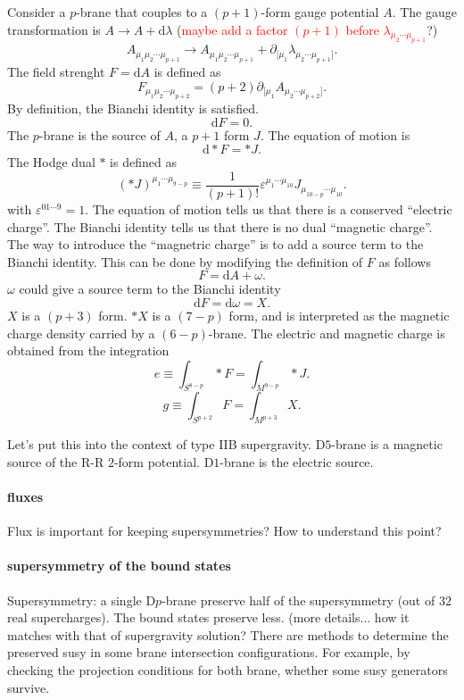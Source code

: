 Consider a $p$-brane that couples to a $(p+1)$-form gauge potential $A$.
The gauge transformation is $A \to A + \mathrm{d} \lambda$
(\textcolor{red}{maybe add a factor $(p+1)$ before $\lambda_{\mu_2\cdots\mu_{p+1}}$}?)
\[
	A_{\mu_1 \mu_2 \cdots \mu_{p+1}} \to A_{\mu_1 \mu_2 \cdots \mu_{p+1}}
	+ \partial_{[\mu_1} \lambda_{\mu_2 \cdots \mu_{p+1}]}
.\] 
The field strenght $F = \mathrm{d} A$ is defined as
\[
	F_{\mu_1 \mu_2 \cdots \mu_{p+2}} = (p+2) \partial_{[\mu_1}
	A_{\mu_2 \cdots \mu_{p+2}]}
.\] 
By definition, the Bianchi identity is satisfied.
\[
\mathrm{d} F = 0
.\] 
The $p$-brane is the source of $A$, a $p+1$ form $J$.
The equation of motion is
\[
\mathrm{d} * F = * J
.\] 
The Hodge dual $*$ is defined as
\[
	(* J)^{\mu_1 \cdots \mu_{9-p}}
	\equiv \frac{1}{(p+1)!} \varepsilon^{\mu_1\cdots \mu_{10}}
	J_{\mu_{10-p}\cdots \mu_{10}}
.\] 
with $\varepsilon^{01\cdots 9} = 1$.
The equation of motion tells us that there is a conserved ``electric charge''.
The Bianchi identity tells us that there is no dual ``magnetic charge''.
The way to introduce the ``magnetric charge'' is to add a source term to the Bianchi identity.
This can be done by modifying the definition of $F$ as follows
\[
F = \mathrm{d}A + \omega
.\] 
$\omega$ could give a source term to the Bianchi identity
\[
\mathrm{d}F = \mathrm{d}\omega = X
.\] 
$X$ is a $(p+3)$ form. $*X$ is a $(7-p)$ form, and is interpreted as the magnetic charge density carried by a $(6-p)$-brane.
The electric and magnetic charge is obtained from the integration
\[
	e \equiv \int_{S^{8-p}} * F = \int_{M^{9-p}} *J
.\] 
\[
	g \equiv \int_{S^{p+2}} F = \int_{M^{p+3}} X
.\] 

Let's put this into the context of type IIB supergravity.
D$5$-brane is a magnetic source of the R-R $2$-form potential.
D$1$-brane is the electric source.

\paragraph{fluxes}
Flux is important for keeping supersymmetries?
How to understand this point?

\paragraph{supersymmetry of the bound states}
Supersymmetry: a single D$p$-brane preserve half of the supersymmetry
(out of $32$ real supercharges).
The bound states preserve less. (more details...
how it matches with that of supergravity solution?
There are methods to determine the preserved susy in some brane intersection configurations.
For example, by checking the projection conditions for both brane, whether some susy generators survive.

